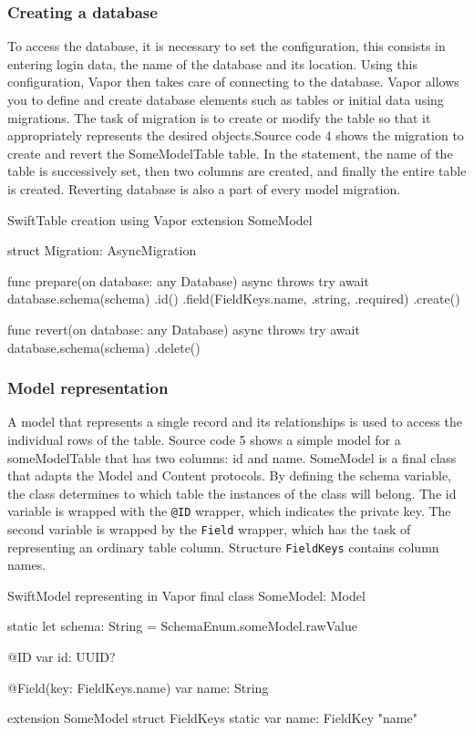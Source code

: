 \documentclass[
  language=english,
  figures=false,
  sourcecodes,
  index
]{kidiplom}
\begin{document}
\subsubsection{Creating a database}
To access the database, it is necessary to set the configuration, this consists in entering login data, the name of the database and its location. Using this configuration, Vapor then takes care of connecting to the database. Vapor allows you to define and create database elements such as tables or initial data using migrations. The task of migration is to create or modify the table so that it appropriately represents the desired objects.Source code 4 shows the migration to create and revert the SomeModelTable table. In the statement, the name of the table is successively set, then two columns are created, and finally the entire table is created. Reverting database is also a part of every model migration.

\begin{kicode}{Swift}{}{Table creation using Vapor}
extension SomeModel {
    struct Migration: AsyncMigration {
        
        func prepare(on database: any Database) async throws {
            try await database.schema(schema)
                .id()
                .field(FieldKeys.name, .string, .required)
                .create()
        }
        
        func revert(on database: any Database) async throws {
            try await database.schema(schema)
                .delete()
        }
    }
}
\end{kicode}

\subsubsection{Model representation}
A model that represents a single record and its relationships is used to access the individual rows of the table. Source code 5 shows a simple model for a someModelTable that has two columns: id and name. SomeModel is a final class that adapts the Model and Content protocols. By defining the schema variable, the class determines to which table the instances of the class will belong. The id variable is wrapped with the \texttt{@ID} wrapper, which indicates the private key. The second variable is wrapped by the \texttt{Field} wrapper, which has the task of representing an ordinary table column. Structure \texttt{FieldKeys} contains column names.

\begin{kicode}{Swift}{}{Model representing in Vapor}
final class SomeModel: Model {
    
    static let schema: String = SchemaEnum.someModel.rawValue
    
    @ID
    var id: UUID?
    
    @Field(key: FieldKeys.name)
    var name: String
}
extension SomeModel {
    struct FieldKeys {
        static var name: FieldKey {"name"}
    }
}
\end{kicode}
\end{document}
